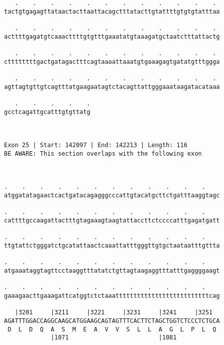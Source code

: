 \documentclass{article}
\begin{document}
\begin{Verbatim}
   .    .    .    .    .    .    .    .    .    .    .    . 
tactgtgagagttataactacttaattacagctttatacttgtattttgtgtgtatttaa
                                                            
   .    .    .    .    .    .    .    .    .    .    .    . 
acttttgagatgtcaaacttttgtgtttgaaatatgtaaagatgctaatctttattactg
                                                            
   .    .    .    .    .    .    .    .    .    .    .    . 
cttttttttgactgatagactttcagtaaaattaaatgtgaaagagtgatatgtttggga
                                                            
   .    .    .    .    .    .    .    .    .    .    .    . 
agttagtgttgtcagtttatgaagaatagtctacagttattgggaaataagatacataaa
                                                            
   .    .    .    .    .
gcctcagattgcatttgtgttatg
                        
                        
 
Exon 25 | Start: 142097 | End: 142213 | Length: 116
BE AWARE: This section overlaps with the following exon



.    .    .    .    .    .    .    .    .    .    .    .    
atggatatagaactcactgatacagagggcccattgtacatgcttctgatttaaggtagc
                                                            
.    .    .    .    .    .    .    .    .    .    .    .    
cattttgccaagattactttgtagaaagtaagtattaccttctccccatttgagatgatt
                                                            
.    .    .    .    .    .    .    .    .    .    .    .    
ttgtattctgggatctgcatattaactcaaattatttgggttgtgctaataatttgttta
                                                            
.    .    .    .    .    .    .    .    .    .    .    .    
atgaaataggtagttcctaaggtttatatctgttagtaagaggtttatttgaggggaagt
                                                            
.    .    .    .    .    .    .    .    .    .    .    .    
gaaagaacttgaaagattcatggtctctaaattttttttttttttttttttttttttcag
                                                            
   |3201     |3211     |3221     |3231     |3241     |3251  
AGATTTGGACCAGGCAAGCATGGAAGCAGTAGTTTCACTTCTAGCTGGTCTCCCTCTGCA
 D  L  D  Q  A  S  M  E  A  V  V  S  L  L  A  G  L  P  L  Q 
             |1071                         |1081            
  

\end{Verbatim}
\end{document}
